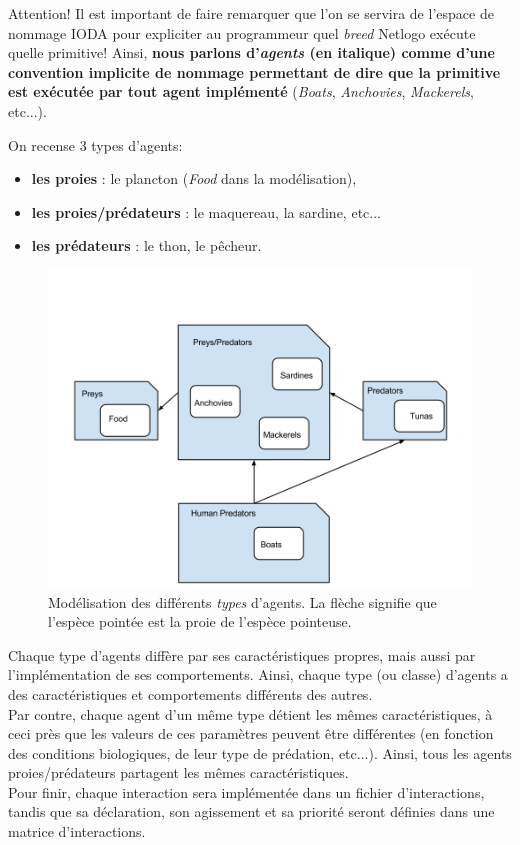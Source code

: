 Attention! Il est important de faire remarquer que l'on se servira de l'espace de nommage IODA pour expliciter au programmeur quel \textit{breed} Netlogo exécute quelle primitive! Ainsi, \textbf{nous parlons d'\textit{agents} (en italique) comme d'une convention implicite de nommage permettant de dire que la primitive est exécutée par tout agent implémenté} (\textit{Boats}, \textit{Anchovies}, \textit{Mackerels}, etc...).

On recense 3 types d'agents:
\begin{itemize}
	\item{\textbf{les proies} : le plancton (\textit{Food} dans la modélisation),}
	\item{\textbf{les proies/prédateurs} : le maquereau, la sardine, etc...}
	\item{\textbf{les prédateurs} : le thon, le pêcheur.}
\end{itemize}

\begin{figure}[h]
\begin{center}
\includegraphics[scale=0.46]{img/agents_exemple.png}
\end{center}
\caption{Modélisation des différents \textit{types} d'agents. La flèche signifie que l'espèce pointée est la proie de l'espèce pointeuse.}
\label{fig:beed_exemple}
\end{figure}

Chaque type d'agents diffère par ses caractéristiques propres, mais aussi par l'implémentation de ses comportements. Ainsi, chaque type (ou classe) d'agents a des caractéristiques et comportements différents des autres.
\\
Par contre, chaque agent d'un même type détient les mêmes caractéristiques, à ceci près que les valeurs de ces paramètres peuvent être différentes (en fonction des conditions biologiques, de leur type de prédation, etc...). Ainsi, tous les agents proies/prédateurs partagent les mêmes caractéristiques.
\\
Pour finir, chaque interaction sera implémentée dans un fichier d'interactions, tandis que sa déclaration, son agissement et sa priorité seront définies dans une matrice d'interactions.

